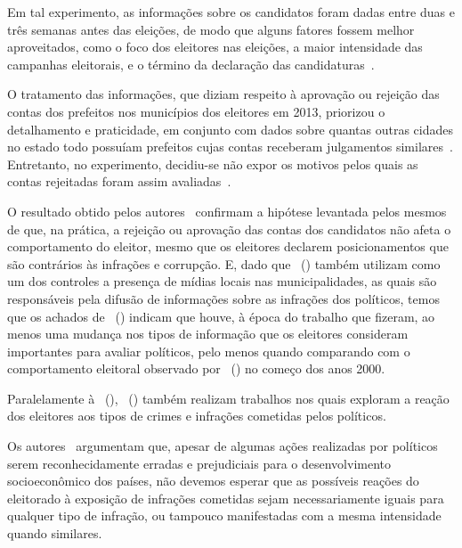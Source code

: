 \documentclass[
	12pt,				%
	openright,			%
	twoside,			%
	a4paper,			%
	openany,
	english,			%
	brazil				%
	]{abntex2}
\begin{document}
Em tal experimento, as informações sobre os candidatos foram dadas entre duas e três semanas antes das eleições, de modo que alguns fatores fossem melhor aproveitados, como o foco dos eleitores nas eleições, a maior intensidade das campanhas eleitorais, e o término da declaração das candidaturas~\cite{Boas2019Apr}.

O tratamento das informações, que diziam respeito à aprovação ou rejeição das contas dos prefeitos nos municípios dos eleitores em 2013, priorizou o detalhamento e praticidade, em conjunto com dados sobre quantas outras cidades no estado todo possuíam prefeitos cujas contas receberam julgamentos similares~\cite{Boas2019Apr}. Entretanto, no experimento, decidiu-se não expor os motivos pelos quais as contas rejeitadas foram assim avaliadas~\cite{Boas2019Apr}.

O resultado obtido pelos autores~\cite{Boas2019Apr} confirmam a hipótese levantada pelos mesmos de que, na prática, a rejeição ou aprovação das contas dos candidatos não afeta o comportamento do eleitor, mesmo que os eleitores declarem posicionamentos que são contrários às infrações e corrupção. E, dado que ~(\citeyear{ferraz2008exposing}) também utilizam como um dos controles a presença de mídias locais nas municipalidades, as quais são responsáveis pela difusão de informações sobre as infrações dos políticos, temos que os achados de ~(\citeyear{Boas2019Apr}) indicam que houve, à época do trabalho que fizeram, ao menos uma mudança nos tipos de informação que os eleitores consideram importantes para avaliar políticos, pelo menos quando comparando com o comportamento eleitoral observado por ~(\citeyear{ferraz2008exposing}) no começo dos anos 2000.



Paralelamente à ~(\citeyear{Boas2019Apr}), ~(\citeyear{Botero2021Apr}) também realizam trabalhos nos quais exploram a reação dos eleitores aos tipos de crimes e infrações cometidas pelos políticos.

Os autores~\cite{Botero2021Apr} argumentam que, apesar de algumas ações realizadas por políticos serem reconhecidamente erradas e prejudiciais para o desenvolvimento socioeconômico dos países, não devemos esperar que as possíveis reações do eleitorado à exposição de infrações cometidas sejam necessariamente iguais para qualquer tipo de infração, ou tampouco manifestadas com a mesma intensidade quando similares.
\end{document}
